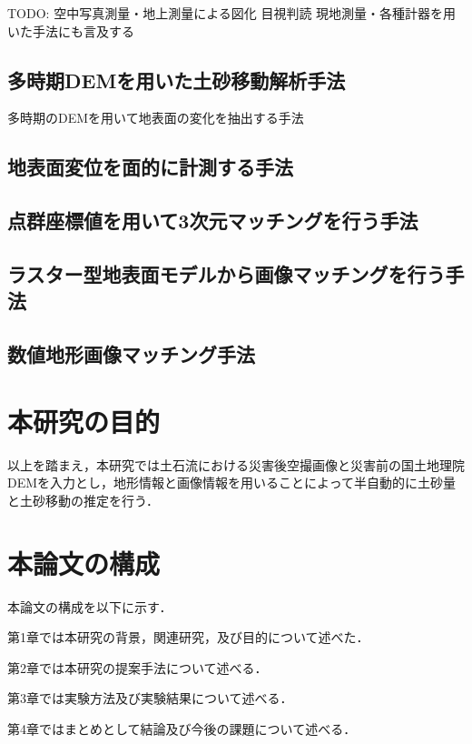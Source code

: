     TODO: 空中写真測量・地上測量による図化
    目視判読
    現地測量・各種計器を用いた手法にも言及する

    \subsection{多時期DEMを用いた土砂移動解析手法}
      多時期のDEMを用いて地表面の変化を抽出する手法

    \subsection{地表面変位を面的に計測する手法}


    \subsection{点群座標値を用いて3次元マッチングを行う手法}


    \subsection{ラスター型地表面モデルから画像マッチングを行う手法}


    \subsection{数値地形画像マッチング手法}


  \section{本研究の目的}
    以上を踏まえ，本研究では土石流における災害後空撮画像と災害前の国土地理院DEM\cite{使用データ1}を入力とし，地形情報と画像情報を用いることによって半自動的に土砂量と土砂移動の推定を行う．


  \section{本論文の構成}
    本論文の構成を以下に示す．
    
    第1章では本研究の背景，関連研究，及び目的について述べた．

    第2章では本研究の提案手法について述べる．
    
    第3章では実験方法及び実験結果について述べる．

    第4章ではまとめとして結論及び今後の課題について述べる．


